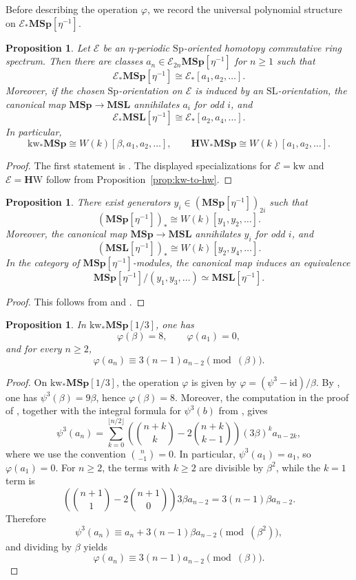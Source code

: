 \documentclass[a4paper]{amsart}
\theoremstyle{plain}
\newtheorem{proposition}[subsubsection]{Proposition}
\theoremstyle{definition}
\newcommand{\Sp}{\mathrm{Sp}}
\newcommand{\SL}{\mathrm{SL}}
\newcommand{\MSp}{\mathbf{MSp}}
\newcommand{\MSL}{\mathbf{MSL}}
\newcommand{\etainv}{\eta^{-1}}
\newcommand{\MSpetainv}{{\MSp[\etainv]}}
\newcommand{\MSLetainv}{{\MSL[\etainv]}}
\newcommand{\E}{\mathcal{E}}
\newcommand{\HW}{\mathbf{H}\mathrm{W}}
\newcommand{\kw}{\mathrm{kw}}
\renewcommand{\ge}{\geqslant}
\begin{document}
Before describing the operation $\varphi$, we record the universal polynomial structure on $\E_*\MSpetainv$.

\begin{proposition}\label{prop:e-msp-homology}
	Let $\E$ be an $\eta$-periodic $\Sp$-oriented homotopy commutative ring spectrum. Then there are classes $a_n\in \E_{2n}\MSpetainv$ for $n\ge 1$ such that
	\[
		\E_*\MSpetainv \cong \E_*[a_1,a_2,\ldots].
	\]
	Moreover, if the chosen $\Sp$-orientation on $\E$ is induced by an $\SL$-orientation, the canonical map $\MSp \to \MSL$ annihilates $a_{i}$ for odd $i$, and
	\[
		\E_*\MSLetainv \cong \E_*[a_2,a_4,\ldots].
	\]
	In particular,
	\[
		\kw_*\MSp \cong W(k)[\beta,a_1,a_2,\ldots],\qquad
		\HW_*\MSp \cong W(k)[a_1,a_2,\ldots].
	\]
\end{proposition}
\begin{proof}
	The first statement is \cite[Theorem~4.1]{bachmann2021eta}. The displayed specializations for $\E=\kw$ and $\E=\HW$ follow from Proposition~\ref{prop:kw-to-hw}.
\end{proof}

\begin{proposition}\label{prop:msp-msl-coefficients}
	There exist generators $y_i\in (\MSpetainv)_{2i}$ such that
	\[
		(\MSpetainv)_* \cong W(k)[y_1,y_2,\ldots].
	\]
	Moreover, the canonical map $\MSp \to \MSL$ annihilates $y_{i}$ for odd $i$, and
	\[
		(\MSLetainv)_* \cong W(k)[y_2,y_4,\ldots].
	\]
	In the category of $\MSpetainv$-modules, the canonical map induces an equivalence
	\[
		\MSpetainv/(y_1,y_3,\ldots)\simeq \MSLetainv.
	\]
\end{proposition}
\begin{proof}
	This follows from \cite[Proposition~5.6]{bachmann2022eta} and \cite[Theorem~8.7 and Corollary~8.9]{bachmann2021eta}.
\end{proof}

\begin{proposition}\label{prop:varphi-on-kw-msp}
	In $\kw_*\MSp [1/3]$, one has
	\[
		\varphi(\beta)=8,\qquad \varphi(a_1)=0,
	\]
	and for every $n\ge 2$,
	\[
		\varphi(a_n)\equiv 3(n-1)a_{n-2}\pmod{(\beta)}.
	\]
\end{proposition}
\begin{proof}
	On $\kw_*\MSp[1/3]$, the operation $\varphi$ is given by $\varphi=(\psi^3-\mathrm{id})/\beta$. By \cite[Theorem~3.1(2)]{bachmann2021eta}, one has $\psi^3(\beta)=9\beta$, hence $\varphi(\beta)=8$. Moreover, the computation in the proof of \cite[Proposition~4.3]{bachmann2021eta}, together with the integral formula for $\psi^3(b)$ from \cite[Remark~4.18]{bachmann2021eta}, gives
	\[
		\psi^3(a_n)=\sum_{k=0}^{\lfloor n/2\rfloor}
		\left(\binom{n+k}{k}-2\binom{n+k}{k-1}\right)(3\beta)^k a_{n-2k},
	\]
	where we use the convention $\binom{n}{-1}=0$. In particular, $\psi^3(a_1)=a_1$, so $\varphi(a_1)=0$. For $n\ge 2$, the terms with $k\ge 2$ are divisible by $\beta^2$, while the $k=1$ term is
	\[
		\left(\binom{n+1}{1}-2\binom{n+1}{0}\right)3\beta a_{n-2}=3(n-1)\beta a_{n-2}.
	\]
	Therefore
	\[
		\psi^3(a_n)\equiv a_n+3(n-1)\beta a_{n-2}\pmod{(\beta^2)},
	\]
	and dividing by $\beta$ yields
	\[
		\varphi(a_n)\equiv 3(n-1)a_{n-2}\pmod{(\beta)}.
	\]
\end{proof}
\end{document}
